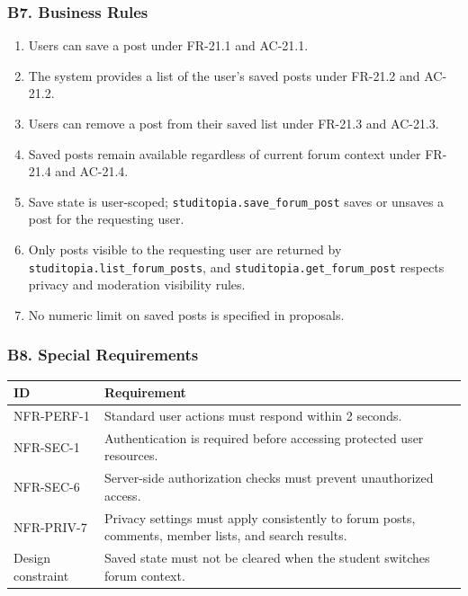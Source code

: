 \documentclass[12pt]{article}
\renewcommand{\baselinestretch}{1.5}
\begin{document}
\hypertarget{sec:b7-business-rules}{}
\subsubsection*{B7. Business Rules}
\par\medskip

\begin{enumerate}
\item Users can save a post under FR-21.1 and AC-21.1.
\item The system provides a list of the user's saved posts under FR-21.2 and AC-21.2.
\item Users can remove a post from their saved list under FR-21.3 and AC-21.3.
\item Saved posts remain available regardless of current forum context under FR-21.4 and AC-21.4.
\item Save state is user-scoped; \texttt{studitopia.save\_forum\_post} saves or unsaves a post for the requesting user.
\item Only posts visible to the requesting user are returned by \texttt{studitopia.list\_forum\_posts}, and \texttt{studitopia.get\_forum\_post} respects privacy and moderation visibility rules.
\item No numeric limit on saved posts is specified in proposals.
\end{enumerate}
\par\medskip

\hypertarget{sec:b8-special-requirements}{}
\subsubsection*{B8. Special Requirements}
\par\medskip

\begingroup
\small
\renewcommand{\baselinestretch}{1.0}\selectfont
\renewcommand{\arraystretch}{1.15}
\setlength{\tabcolsep}{6pt}
\begin{longtable}{|>{\raggedright\arraybackslash}p{}|>{\raggedright\arraybackslash}p{}|}
\hline
\textbf{ID} & \textbf{Requirement} \\ \hline
\endhead
NFR-PERF-1 & Standard user actions must respond within 2 seconds. \\ \hline
NFR-SEC-1 & Authentication is required before accessing protected user resources. \\ \hline
NFR-SEC-6 & Server-side authorization checks must prevent unauthorized access. \\ \hline
NFR-PRIV-7 & Privacy settings must apply consistently to forum posts, comments, member lists, and search results. \\ \hline
Design constraint & Saved state must not be cleared when the student switches forum context. \\ \hline
\end{longtable}
\endgroup
\par\medskip
\end{document}
